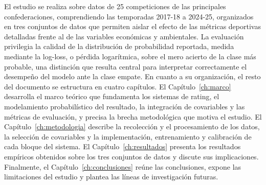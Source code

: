 El estudio se realiza sobre datos de 25 competiciones de las principales confederaciones, comprendiendo las temporadas 2017-18 a 2024-25, organizados en tres conjuntos de datos que permiten aislar el efecto de las m\'etricas deportivas detalladas frente al de las variables econ\'omicas y ambientales. La evaluaci\'on privilegia la calidad de la distribuci\'on de probabilidad reportada, medida mediante la log-loss, o p\'erdida logar\'itmica, sobre el mero acierto de la clase m\'as probable, una distinci\'on que resulta central para interpretar correctamente el desempe\~no del modelo ante la clase empate. En cuanto a su organizaci\'on, el resto del documento se estructura en cuatro cap\'itulos. El Cap\'itulo~\ref{ch:marco} desarrolla el marco te\'orico que fundamenta los sistemas de rating, el modelamiento probabil\'istico del resultado, la integraci\'on de covariables y las m\'etricas de evaluaci\'on, y precisa la brecha metodol\'ogica que motiva el estudio. El Cap\'itulo~\ref{ch:metodologia} describe la recolecci\'on y el procesamiento de los datos, la selecci\'on de covariables y la implementaci\'on, entrenamiento y calibraci\'on de cada bloque del sistema. El Cap\'itulo~\ref{ch:resultados} presenta los resultados emp\'iricos obtenidos sobre los tres conjuntos de datos y discute sus implicaciones. Finalmente, el Cap\'itulo~\ref{ch:conclusiones} re\'une las conclusiones, expone las limitaciones del estudio y plantea las l\'ineas de investigaci\'on futuras.